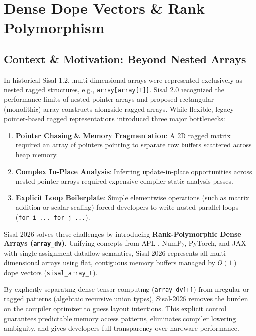 \chapter{Dense Dope Vectors \& Rank Polymorphism}
\label{chap:rank_polymorphism}

\section{Context \& Motivation: Beyond Nested Arrays}
In historical Sisal 1.2, multi-dimensional arrays were represented exclusively as nested ragged structures, e.g., \texttt{array[array[T]]}. Sisal 2.0 recognized the performance limits of nested pointer arrays and proposed rectangular (monolithic) array constructs alongside ragged arrays. While flexible, legacy pointer-based ragged representations introduced three major bottlenecks:
\begin{enumerate}
    \item \textbf{Pointer Chasing \& Memory Fragmentation}: A 2D ragged matrix required an array of pointers pointing to separate row buffers scattered across heap memory.
    \item \textbf{Complex In-Place Analysis}: Inferring update-in-place opportunities across nested pointer arrays required expensive compiler static analysis passes.
    \item \textbf{Explicit Loop Boilerplate}: Simple elementwise operations (such as matrix addition or scalar scaling) forced developers to write nested parallel loops (\texttt{for i ... for j ...}).
\end{enumerate}

Sisal-2026 solves these challenges by introducing \textbf{Rank-Polymorphic Dense Arrays (\texttt{array\_dv})}. Unifying concepts from APL \cite{iverson1962}, NumPy, PyTorch, and JAX with single-assignment dataflow semantics, Sisal-2026 represents all multi-dimensional arrays using flat, contiguous memory buffers managed by $O(1)$ dope vectors (\texttt{sisal\_array\_t}).

\begin{tip}[title={Design Philosophy: Not a Weakness, But a Strength}]
By explicitly separating dense tensor computing (\texttt{array\_dv[T]}) from irregular or ragged patterns (algebraic recursive union types), Sisal-2026 removes the burden on the compiler optimizer to guess layout intentions. This explicit control guarantees predictable memory access patterns, eliminates compiler lowering ambiguity, and gives developers full transparency over hardware performance.
\end{tip}

